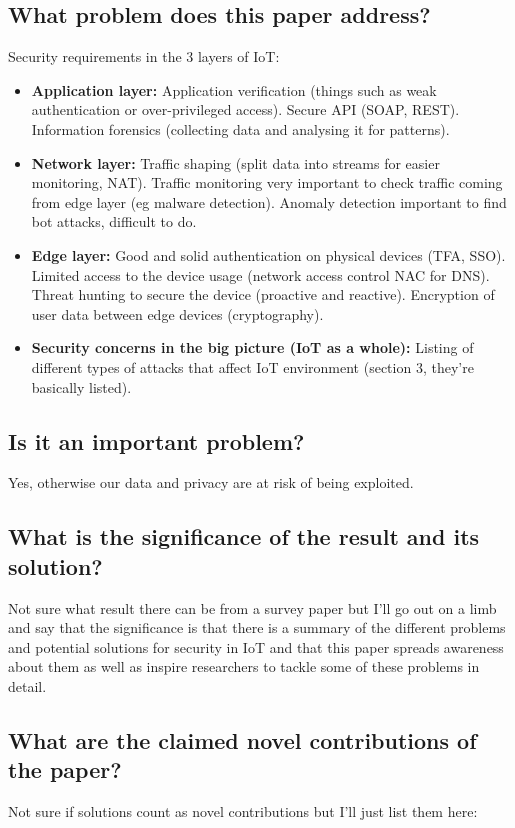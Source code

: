 \documentclass[11pt,a4paper]{article}
\begin{document}
\subsection*{What problem does this paper address?}
Security requirements in the 3 layers of IoT: 
\begin{itemize}
    \item \textbf{Application layer:} Application verification (things such as weak authentication or over-privileged access). Secure API (SOAP, REST). Information forensics (collecting data and analysing it for patterns).
    \item \textbf{Network layer:} Traffic shaping (split data into streams for easier monitoring, NAT). Traffic monitoring very important to check traffic coming from edge layer (eg malware detection). Anomaly detection important to find bot attacks, difficult to do. 
    \item \textbf{Edge layer:} Good and solid authentication on physical devices (TFA, SSO). Limited access to the device usage (network access control NAC for DNS). Threat hunting to secure the device (proactive and reactive). Encryption of user data between edge devices (cryptography). 
    \item \textbf{Security concerns in the big picture (IoT as a whole):} Listing of different types of attacks that affect IoT environment (section 3, they’re basically listed). 
\end{itemize}

\subsection*{Is it an important problem?}
Yes, otherwise our data and privacy are at risk of being exploited.

\subsection*{What is the significance of the result and its solution?}
Not sure what result there can be from a survey paper but I’ll go out on a limb and say that the significance is that there is a summary of the different problems and potential solutions for security in IoT and that this paper spreads awareness about them as well as inspire researchers to tackle some of these problems in detail.

\subsection*{What are the claimed novel contributions of the paper?}
Not sure if solutions count as novel contributions but I’ll just list them here:
\end{document}
